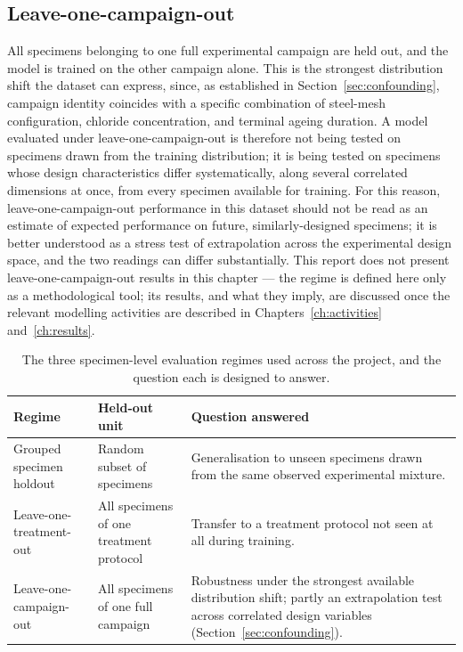\subsection{Leave-one-campaign-out}
\label{sec:loco}

All specimens belonging to one full experimental campaign are held out,
and the model is trained on the other campaign alone. This is the
strongest distribution shift the dataset can express, since, as
established in Section~\ref{sec:confounding}, campaign identity coincides
with a specific combination of steel-mesh configuration, chloride
concentration, and terminal ageing duration. A model evaluated under
leave-one-campaign-out is therefore not being tested on specimens drawn
from the training distribution; it is being tested on specimens whose
design characteristics differ systematically, along several correlated
dimensions at once, from every specimen available for training. For this
reason, leave-one-campaign-out performance in this dataset should not be
read as an estimate of expected performance on future, similarly-designed
specimens; it is better understood as a stress test of extrapolation
across the experimental design space, and the two readings can differ
substantially. This report does not present leave-one-campaign-out results
in this chapter — the regime is defined here only as a methodological
tool; its results, and what they imply, are discussed once the relevant
modelling activities are described in Chapters~\ref{ch:activities}
and~\ref{ch:results}.

\begin{table}[htbp]
\centering
\caption{The three specimen-level evaluation regimes used across the
project, and the question each is designed to answer.}
\label{tab:eval-regimes}
\begin{tabular}{p{3.6cm}p{3.6cm}p{6.2cm}}
\toprule
Regime & Held-out unit & Question answered \\
\midrule
Grouped specimen holdout & Random subset of specimens & Generalisation to
unseen specimens drawn from the same observed experimental mixture. \\
Leave-one-treatment-out & All specimens of one treatment protocol & Transfer
to a treatment protocol not seen at all during training. \\
Leave-one-campaign-out & All specimens of one full campaign & Robustness
under the strongest available distribution shift; partly an extrapolation
test across correlated design variables (Section~\ref{sec:confounding}). \\
\bottomrule
\end{tabular}
\end{table}

